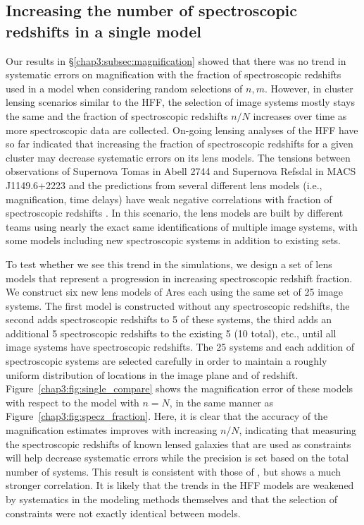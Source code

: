 \subsection{Increasing the number of spectroscopic redshifts in a single model}
\label{chap3:subsec:n_specz}
Our results in \S\ref{chap3:subsec:magnification} showed that there was no trend in systematic errors on magnification with the fraction of spectroscopic redshifts used in a model when considering random selections of $n,m$. However, in cluster lensing scenarios similar to the HFF, the selection of image systems mostly stays the same and the fraction of spectroscopic redshifts $n/N$ increases over time as more spectroscopic data are collected. On-going lensing analyses of the HFF have so far indicated that increasing the fraction of spectroscopic redshifts for a given cluster may decrease systematic errors on its lens models. The tensions between observations of Supernova Tomas in Abell 2744 and Supernova Refsdal in MACS J1149.6+2223 and the predictions from several different lens models (i.e., magnification, time delays) have weak negative correlations with fraction of spectroscopic redshifts \citep{Rodney:2015uq,Rodney:2016sf}. In this scenario, the lens models are built by different teams using nearly the exact same identifications of multiple image systems, with some models including new spectroscopic systems in addition to existing sets.

To test whether we see this trend in the simulations, we design a set of lens models that represent a progression in increasing spectroscopic redshift fraction. We construct six new lens models of Ares each using the same set of 25 image systems. The first model is constructed without any spectroscopic redshifts, the second adds spectroscopic redshifts to 5 of these systems, the third adds an additional 5 spectroscopic redshifts to the existing 5 (10 total), etc., until all image systems have spectroscopic redshifts. The 25 systems and each addition of spectroscopic systems are selected carefully in order to maintain a roughly uniform distribution of locations in the image plane and of redshift. Figure~\ref{chap3:fig:single_compare} shows the magnification error of these models with respect to the model with $n=N$, in the same manner as Figure~\ref{chap3:fig:specz_fraction}. Here, it is clear that the accuracy of the magnification estimates improves with increasing $n/N$, indicating that measuring the spectroscopic redshifts of known lensed galaxies that are used as constraints will help decrease systematic errors while the precision is set based on the total number of systems. This result is consistent with those of \citet{Rodney:2015uq,Rodney:2016sf}, but shows a much stronger correlation. It is likely that the trends in the HFF models are weakened by systematics in the modeling methods themselves and that the selection of constraints were not exactly identical between models.

